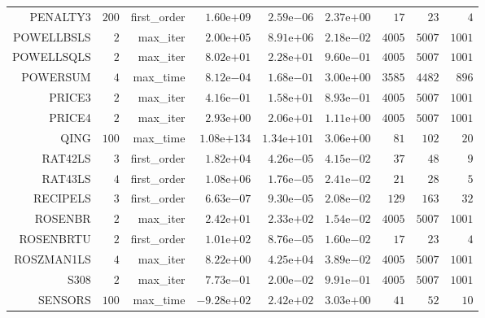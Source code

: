 \begin{longtable}{rrrrrrrrr}
PENALTY3 & \(   200\) & first\_order & \( 1.60\)e\(+09\) & \( 2.59\)e\(-06\) & \( 2.37\)e\(+00\) & \(    17\) & \(    23\) & \(     4\) \\
POWELLBSLS & \(     2\) & max\_iter & \( 2.00\)e\(+05\) & \( 8.91\)e\(+06\) & \( 2.18\)e\(-02\) & \(  4005\) & \(  5007\) & \(  1001\) \\
POWELLSQLS & \(     2\) & max\_iter & \( 8.02\)e\(+01\) & \( 2.28\)e\(+01\) & \( 9.60\)e\(-01\) & \(  4005\) & \(  5007\) & \(  1001\) \\
POWERSUM & \(     4\) & max\_time & \( 8.12\)e\(-04\) & \( 1.68\)e\(-01\) & \( 3.00\)e\(+00\) & \(  3585\) & \(  4482\) & \(   896\) \\
PRICE3 & \(     2\) & max\_iter & \( 4.16\)e\(-01\) & \( 1.58\)e\(+01\) & \( 8.93\)e\(-01\) & \(  4005\) & \(  5007\) & \(  1001\) \\
PRICE4 & \(     2\) & max\_iter & \( 2.93\)e\(+00\) & \( 2.06\)e\(+01\) & \( 1.11\)e\(+00\) & \(  4005\) & \(  5007\) & \(  1001\) \\
QING & \(   100\) & max\_time & \(1.08\)e\(+134\) & \(1.34\)e\(+101\) & \( 3.06\)e\(+00\) & \(    81\) & \(   102\) & \(    20\) \\
RAT42LS & \(     3\) & first\_order & \( 1.82\)e\(+04\) & \( 4.26\)e\(-05\) & \( 4.15\)e\(-02\) & \(    37\) & \(    48\) & \(     9\) \\
RAT43LS & \(     4\) & first\_order & \( 1.08\)e\(+06\) & \( 1.76\)e\(-05\) & \( 2.41\)e\(-02\) & \(    21\) & \(    28\) & \(     5\) \\
RECIPELS & \(     3\) & first\_order & \( 6.63\)e\(-07\) & \( 9.30\)e\(-05\) & \( 2.08\)e\(-02\) & \(   129\) & \(   163\) & \(    32\) \\
ROSENBR & \(     2\) & max\_iter & \( 2.42\)e\(+01\) & \( 2.33\)e\(+02\) & \( 1.54\)e\(-02\) & \(  4005\) & \(  5007\) & \(  1001\) \\
ROSENBRTU & \(     2\) & first\_order & \( 1.01\)e\(+02\) & \( 8.76\)e\(-05\) & \( 1.60\)e\(-02\) & \(    17\) & \(    23\) & \(     4\) \\
ROSZMAN1LS & \(     4\) & max\_iter & \( 8.22\)e\(+00\) & \( 4.25\)e\(+04\) & \( 3.89\)e\(-02\) & \(  4005\) & \(  5007\) & \(  1001\) \\
S308 & \(     2\) & max\_iter & \( 7.73\)e\(-01\) & \( 2.00\)e\(-02\) & \( 9.91\)e\(-01\) & \(  4005\) & \(  5007\) & \(  1001\) \\
SENSORS & \(   100\) & max\_time & \(-9.28\)e\(+02\) & \( 2.42\)e\(+02\) & \( 3.03\)e\(+00\) & \(    41\) & \(    52\) & \(    10\) \\

\end{longtable}
